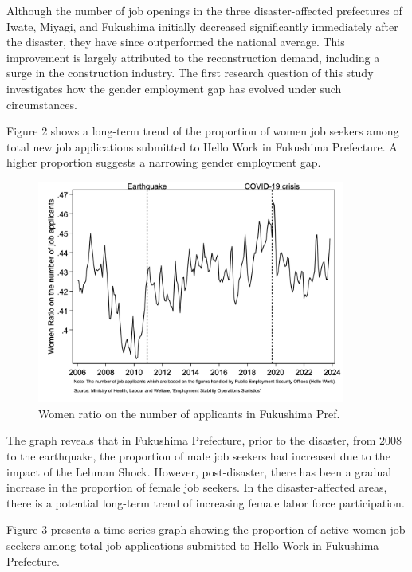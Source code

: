 \documentclass[12pt,halfline,a4paper]{ouparticle}
\begin{document}
\newpage

Although the number of job openings in the three disaster-affected prefectures of Iwate, Miyagi, and Fukushima initially decreased significantly immediately after the disaster, they have since outperformed the national average. This improvement is largely attributed to the reconstruction demand, including a surge in the construction industry. The first research question of this study investigates how the gender employment gap has evolved under such circumstances.


\newpage

Figure 2 shows a long-term trend of the proportion of women job seekers among total new job applications submitted to Hello Work in Fukushima Prefecture. A higher proportion suggests a narrowing gender employment gap. 

\begin{figure}[h!]
    \centering
    \includegraphics[width=0.9\textwidth]{Women ratio on the number of job applicants.jpg}  %
    \caption{Women ratio on the number of applicants in Fukushima Pref.}
    \label{fig:women_ratio_fukushima}
\end{figure}


The graph reveals that in Fukushima Prefecture, prior to the disaster, from 2008 to the earthquake, the proportion of male job seekers had increased due to the impact of the Lehman Shock. However, post-disaster, there has been a gradual increase in the proportion of female job seekers. In the disaster-affected areas, there is a potential long-term trend of increasing female labor force participation.

Figure 3 presents a time-series graph showing the proportion of active women job seekers among total job applications submitted to Hello Work in Fukushima Prefecture.
\end{document}
